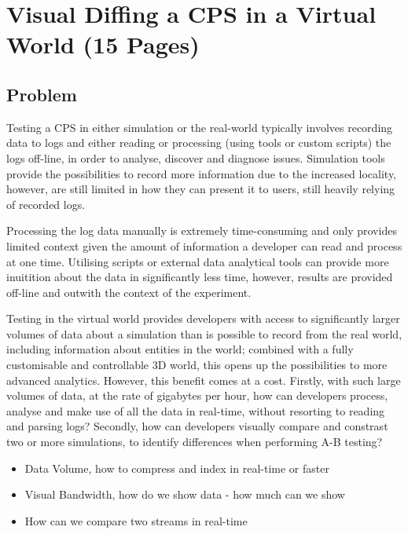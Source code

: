 \chapter{Visual Diffing a CPS in a Virtual World (15 Pages)}

\section{Problem}
\label{sec:Problem}
Testing a CPS in either simulation or the real-world typically involves recording data to logs and either reading or processing (using tools or custom scripts) the logs off-line, in order to analyse, discover and diagnose issues. Simulation tools provide the possibilities to record more information due to the increased locality, however, are still limited in how they can present it to users, still heavily relying of recorded logs.

Processing the log data manually is extremely time-consuming and only provides limited context given the amount of information a developer can read and process at one time. Utilising scripts or external data analytical tools can provide more inuitition about the data in significantly less time, however, results are provided off-line and outwith the context of the experiment.

Testing in the virtual world provides developers with access to significantly larger volumes of data about a simulation than is possible to record from the real world, including information about entities in the world; combined with a fully customisable and controllable 3D world, this opens up the possibilities to more advanced analytics. However, this benefit comes at a cost. Firstly, with such large volumes of data, at the rate of gigabytes per hour, how can developers process, analyse and make use of all the data in real-time, without resorting to reading and parsing logs? Secondly, how can developers visually compare and constrast two or more simulations, to identify differences when performing A-B testing?

\begin{itemize}
  \item Data Volume, how to compress and index in real-time or faster
  \item Visual Bandwidth, how do we show data - how much can we show
  \item How can we compare two streams in real-time
\end{itemize}

